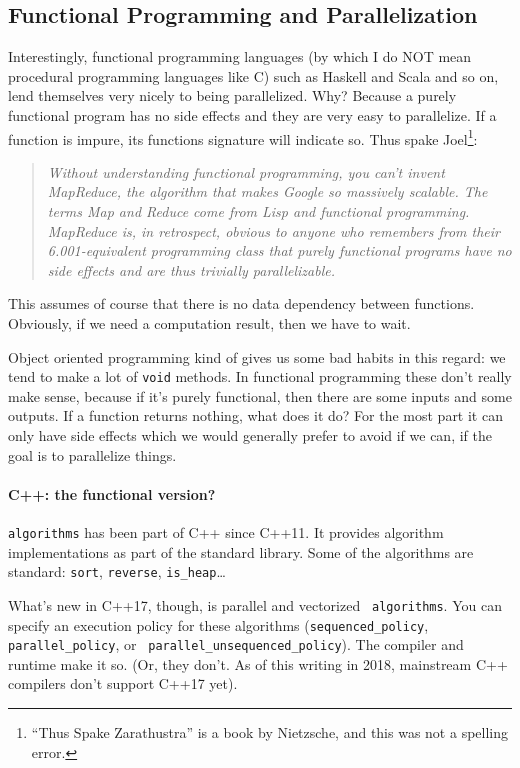 \documentclass[a4paper]{report}
\begin{document}
\subsection*{Functional Programming and Parallelization}
Interestingly, functional programming languages (by which I do NOT mean procedural programming languages like C) such as Haskell and Scala and so on, lend themselves very nicely to being parallelized. Why? Because a purely functional program has no side effects and they are very easy to parallelize. If a function is impure, its functions signature will indicate so. Thus spake Joel\footnote{``Thus Spake Zarathustra'' is a book by Nietzsche, and this was not a spelling error.}:

\begin{quote}
\textit{Without understanding functional programming, you can't invent MapReduce, the algorithm that makes Google so massively scalable. The terms Map and Reduce come from Lisp and functional programming. MapReduce is, in retrospect, obvious to anyone who remembers from their 6.001-equivalent programming class that purely functional programs have no side effects and are thus trivially parallelizable.}~\cite{joel:functional}
\end{quote}

This assumes of course that there is no data dependency between functions. Obviously, if we need a computation result, then we have to wait. 

Object oriented programming kind of gives us some bad habits in this regard: we tend to make a lot of \texttt{void} methods. In functional programming these don't really make sense, because if it's purely functional, then there are some inputs and some outputs. If a function returns nothing, what does it do? For the most part it can only have side effects which we would generally prefer to avoid if we can, if the goal is to parallelize things. 

\paragraph{C++: the functional version?} {\tt algorithms} has been part of C++ since C++11. It provides algorithm implementations as part of the standard library. Some of the algorithms are standard: {\tt sort}, {\tt reverse}, {\tt is\_heap}\ldots

What's new in C++17, though, is parallel and vectorized {\tt
algorithms}. You can specify an execution policy for these algorithms
({\tt sequenced\_policy}, {\tt parallel\_policy}, or {\tt
parallel\_unsequenced\_policy}). The compiler and runtime make it
so. (Or, they don't. As of this writing in 2018, mainstream C++
compilers don't support C++17 yet).
\end{document}
